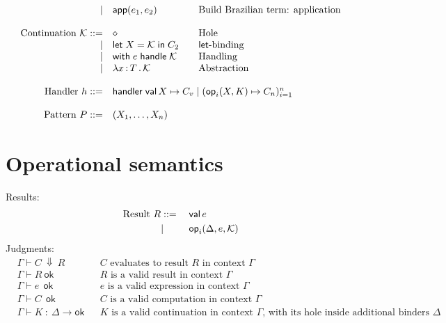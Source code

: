 \documentclass{article}
\newcommand{\G}{\Gamma}
\newcommand{\D}{\Delta}
\newcommand{\bnf}{\mathrel{{:}{:}{=}}}
\newcommand{\bnfor}{|}
\newcommand{\x}{x}     %
\newcommand{\C}{C}     %
\newcommand{\K}{K}     %
\newcommand{\X}{X}     %
\newcommand{\e}{e}     %
\newcommand{\rgn}{r}   %
\newcommand{\h}{h}     %
\newcommand{\T}{T}     %
\newcommand{\KK}{{\cal K}} %
\newcommand{\val}{\mathsf{val}\,} %
\newcommand{\letin}[1]{\mathsf{let}\; #1 \;\mathsf{in}\;} %
\newcommand{\opPat}[3][i]{\mathsf{op}_{#1}(#2, #3)} %
\newcommand{\opRes}[4][i]{\mathsf{op}_{#1}(#2, #3, #4)} %
\newcommand{\withhandle}[1]{\mathsf{with}\;#1\;\mathsf{handle}\;} %
\newcommand{\abs}[1]{\mathsf{abs}\;#1\;\mathsf{in}\;} %
\newcommand{\lam}[2]{\lambda #1 \,{:}\, #2 \,.\,} %
\newcommand{\handler}[6][n]{\mathsf{handler}\; \val #2 \mapsto #3 \mid (\opPat{#4}{#5} \mapsto #6_{#1})_{i=1}^{#1}}
\newcommand{\makeApp}[2]{\mathsf{app}(#1,#2)} %
\newcommand{\hole}{\diamond}
\newcommand{\tuple}[1]{(#1)}
\newcommand{\pat}{P}
\newcommand{\evalto}[3][\G]{#1 \vdash #2 \ \Downarrow\  #3}
\newcommand{\resultok}[2][\G]{#1 \vdash #2 \ \mathsf{ok}}
\newcommand{\eok}[2][\G]{#1 \vdash #2 \ \ \mathsf{ok}}
\newcommand{\cok}[2][\G]{#1 \vdash #2 \ \ \mathsf{ok}}
\newcommand{\kok}[3][\G]{#1 \vdash #3 \ : \ #2\to\mathsf{ok}}
\newcommand{\typicalhandler}{\handler{\X}{\C_v}{\X}{\K}{\C}}
\begin{document}
\begin{equation*}
\begin{array}{rl@{\qquad}l}
    \bnfor  & \makeApp{\e_1}{\e_2} & \text{Build Brazilian term: application} \\
    \\
    \text{Continuation $\KK$} \bnf    & \hole                & \text{Hole} \\
    \bnfor  & \letin{\X = \KK} \C_2  & \text{$\mathsf{let}$-binding} \\
    \bnfor  & \withhandle{\e} \KK & \text{Handling} \\
    \bnfor  & \lam{\x}{\T}{\KK} & \text{Abstraction} \\
    \\

  \text{Handler $\h$}
  \bnf & \multicolumn{2}{l}{\typicalhandler}\\
  \\
  \text{Pattern $\pat$}
  \bnf & \tuple{\X_1,\ldots,\X_n}\\
\end{array}
\end{equation*}



\section{Operational semantics}
\label{sec:oper-semant}

Results:
%
\begin{equation*}
  \text{Result $R$}
  \begin{aligned}[t]
    &\bnf   {} && \val \e \\
    &\bnfor {} && \opRes{\D}{\e}{\KK} \\
  \end{aligned}
\end{equation*}
%
Judgments:
%
\begin{align*}
  &\evalto[\G]{C}{R} &&\text{$C$ evaluates to result $R$ in context $\G$} \\
  &\resultok[\G]{R}  &&\text{$R$ is a valid result in context $\G$} \\
  &\eok[\G]{\e} &&\text{$\e$ is a valid expression in context $\G$} \\
  &\cok[\G]{\C} &&\text{$\C$ is a valid computation in context $\G$} \\
  &\kok[\G]{\D}{\K} &&\text{$\K$ is a valid continuation in context $\G$,
                              with its hole inside additional binders $\D$} \\
\end{align*}
%
\end{document}
